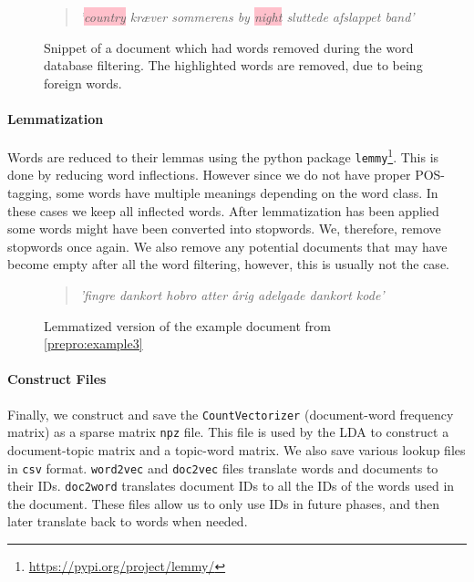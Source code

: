 \begin{figure}[h]
	\begin{framed}
		\begin{quote}
			\textit{
				'\colorbox{pink}{country} kræver sommerens by \colorbox{pink}{night} sluttede afslappet band'
			}
		\end{quote}
	\end{framed}
	\caption{Snippet of a document which had words removed during the word database filtering. The highlighted words are removed, due to being foreign words.}
	\label{prepro:example4}
\end{figure}

\paragraph{Lemmatization}
Words are reduced to their lemmas using the python package \texttt{lemmy}\footnote{\url{https://pypi.org/project/lemmy/}}. 
This is done by reducing word inflections.
However since we do not have proper POS-tagging, some words have multiple meanings depending on the word class.
In these cases we keep all inflected words.
After lemmatization has been applied some words might have been converted into stopwords.
We, therefore, remove stopwords once again.
We also remove any potential documents that may have become empty after all the word filtering, however, this is usually not the case.
\begin{figure}[h]
	\begin{framed}
		\begin{quote}
			\textit{
				'fingre dankort hobro atter årig adelgade dankort kode'
			}
		\end{quote}
	\end{framed}
	\caption{Lemmatized version of the example document from \autoref{prepro:example3}}
	\label{prepro:example5}
\end{figure}

\paragraph{Construct Files}
Finally, we construct and save the \texttt{CountVectorizer} (document-word frequency matrix) as a sparse matrix \texttt{npz} file.
This file is used by the LDA to construct a document-topic matrix and a topic-word matrix.
We also save various lookup files in \texttt{csv} format.
\texttt{word2vec} and \texttt{doc2vec} files translate words and documents to their IDs.
\texttt{doc2word} translates document IDs to all the IDs of the words used in the document.
These files allow us to only use IDs in future phases, and then later translate back to words when needed.

